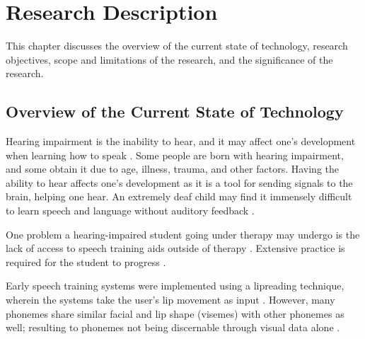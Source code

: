 \chapter{Research Description}
\label{sec:researchdesc}

This chapter discusses the overview of the current state of technology, research objectives, scope and limitations of the research, and the significance of the research.

\section{Overview of the Current State of Technology}
\label{sec:overview}

Hearing impairment is the inability to hear, and it may affect one's development when learning how to speak \cite{lasak:2014:HL}. Some people are born with hearing impairment, and some obtain it due to age, illness, trauma, and other factors. Having the ability to hear affects one's development as it is a tool for sending signals to the brain, helping one hear. An extremely deaf child may find it immensely difficult to learn speech and language without auditory feedback \cite{bernstein:1988:STA}.

\begin{comment}
Throughout the years, man has tried to find ways to help the hearing-handicapped learn how to speak properly \cite{oyer:1976:CHH}. Oyer \citeyear{oyer:1976:CHH} states that there was a time when hearing-handicapped were considered unfit to hold citizenship. James Pickett, a professor of speech communication research says "I believe that large improvements in the lives of deaf persons depends on making large improvements in their speech communication" \cite{connor:1971:SDC}. Pickett also states that in the late 19th century, research began for helping the Deaf communicate \cite{connor:1971:SDC}.
\end{comment}

One problem a hearing-impaired student going under therapy may undergo is the lack of access to speech training aids outside of therapy \cite{bernstein:1988:STA}. Extensive practice is required for the student to progress \cite{bernstein:1988:STA}.

Early speech training systems were implemented using a lipreading technique, wherein the systems take the user's lip movement as input \cite{heracleous:2010:CSA}. However, many phonemes share similar facial and lip shape (visemes) with other phonemes as well; resulting to phonemes not being discernable through visual data alone \cite{heracleous:2010:CSA}.


